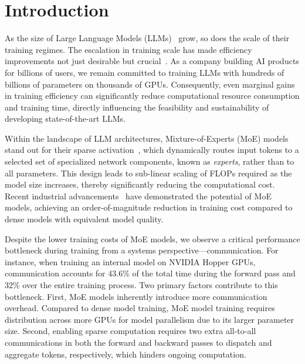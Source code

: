 \section{Introduction}
\label{sec:introduction}


As the size of Large Language Models (LLMs)~\cite{chowdhery2023palm, touvron2023llama, jiang2024mixtral} grow, so does the scale of their training regimes. The escalation in training scale has made efficiency improvements not just desirable but crucial~\cite{jiang2024megascale}. As a company building AI products for billions of users, we remain committed to training LLMs with hundreds of billions of parameters on thousands of GPUs. Consequently, even marginal gains in training efficiency can significantly reduce computational resource consumption and training time, directly influencing the feasibility and sustainability of developing state-of-the-art LLMs.

Within the landscape of LLM architectures, Mixture-of-Experts (MoE) models stand out for their sparse activation~\cite{chowdhery2023palm, jiang2024mixtral, fedus2022switch, shazeer2017outrageously}, which dynamically routes input tokens to a selected set of specialized network components, known as \emph{experts}, rather than to all parameters. This design leads to sub-linear scaling of FLOPs required as the model size increases, thereby significantly reducing the computational cost. 
Recent industrial advancements~\cite{google_GLaM, rajbhandari2022deepspeed, dbrx, grok, liu2024deepseekv3} have demonstrated the potential of MoE models, achieving an order-of-magnitude reduction in training cost compared to dense models with equivalent model quality.

Despite the lower training costs of MoE models, we observe a critical performance bottleneck during training from a systems perspective---communication.
For instance, when training an internal model on NVIDIA Hopper GPUs, communication accounts for 43.6\% of the total time during the forward pass and 32\% over the entire training process. 
Two primary factors contribute to this bottleneck. First, MoE models inherently introduce more communication overhead. Compared to dense model training, MoE model training requires distribution across more GPUs for model parallelism due to its larger parameter size. Second, enabling sparse computation requires two extra all-to-all communications in both the forward and backward passes to dispatch and aggregate tokens, respectively, which hinders ongoing computation.

